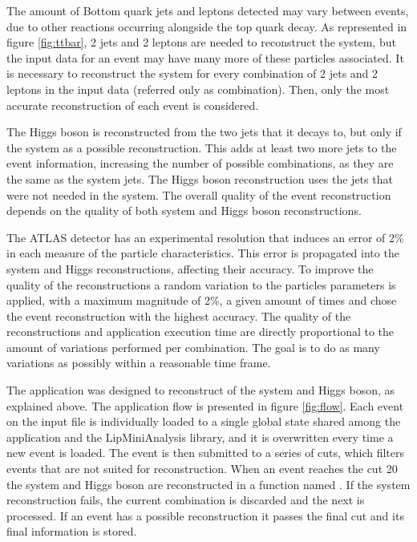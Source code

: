 The amount of Bottom quark jets and leptons detected may vary between events, due to other reactions occurring alongside the top quark decay. As represented in figure \ref{fig:ttbar}, 2 jets and 2 leptons are needed to reconstruct the \ttbar system, but the input data for an event may have many more of these particles associated. It is necessary to reconstruct the system for every combination of 2 jets and 2 leptons in the input data (referred only as combination). Then, only the most accurate reconstruction of each event is considered.

The Higgs boson is reconstructed from the two jets that it decays to, but only if the \ttbar system as a possible reconstruction. This adds at least two more jets to the event information, increasing the number of possible combinations, as they are the same as the \ttbar system jets. The Higgs boson reconstruction uses the jets that were not needed in the \ttbar system. The overall quality of the event reconstruction depends on the quality of both \ttbar system and Higgs boson reconstructions.

The ATLAS detector has an experimental resolution that induces an error of 2\% in each measure of the particle characteristics. This error is propagated into the \ttbar system and Higgs reconstructions, affecting their accuracy. To improve the quality of the reconstructions a random variation to the particles parameters is applied, with a maximum magnitude of 2\%, a given amount of times and chose the event reconstruction with the highest accuracy. The quality of the reconstructions and application execution time are directly proportional to the amount of variations performed per combination. The goal is to do as many variations as possibly within a reasonable time frame.

The \tth application was designed to reconstruct of the \ttbar system and Higgs boson, as explained above. The application flow is presented in figure \ref{fig:flow}. Each event on the input file is individually loaded to a single global state shared among the application and the LipMiniAnalysis library, and it is overwritten every time a new event is loaded. The event is then submitted to a series of cuts, which filters events that are not suited for reconstruction. When an event reaches the cut 20 the \ttbar system and Higgs boson are reconstructed in a function named \ttDilepKinFit. If the \ttbar system reconstruction fails, the current combination is discarded and the next is processed. If an event has a possible reconstruction it passes the final cut and its final information is stored.

